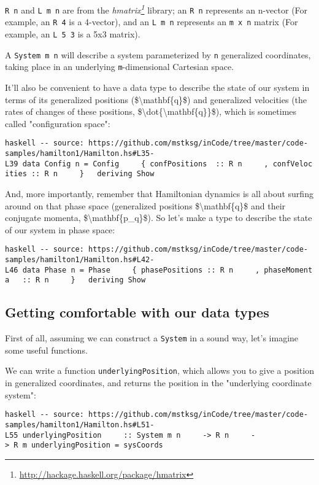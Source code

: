 \documentclass[]{article}
\renewcommand{\href}[2]{#2\footnote{\url{#1}}}
\begin{document}
\texttt{R\ n} and \texttt{L\ m\ n} are from the
\emph{\href{http://hackage.haskell.org/package/hmatrix}{hmatrix}} library; an
\texttt{R\ n} represents an n-vector (For example, an \texttt{R\ 4} is a
4-vector), and an \texttt{L\ m\ n} represents an \texttt{m\ x\ n} matrix (For
example, an \texttt{L\ 5\ 3} is a 5x3 matrix).

A \texttt{System\ m\ n} will describe a system parameterized by \texttt{n}
generalized coordinates, taking place in an underlying \texttt{m}-dimensional
Cartesian space.

It'll also be convenient to have a data type to describe the state of our system
in terms of its generalized positions (\$\textbackslash{}mathbf\{q\}\$) and
generalized velocities (the rates of changes of these positions,
\$\textbackslash{}dot\{\textbackslash{}mathbf\{q\}\}\$), which is sometimes
called "configuration space":

\texttt{haskell\ -\/-\ source:\ https://github.com/mstksg/inCode/tree/master/code-samples/hamilton1/Hamilton.hs\#L35-L39\ data\ Config\ n\ =\ Config\ \ \ \ \ \{\ confPositions\ \ ::\ R\ n\ \ \ \ \ ,\ confVelocities\ ::\ R\ n\ \ \ \ \ \}\ \ \ deriving\ Show}

And, more importantly, remember that Hamiltonian dynamics is all about surfing
around on that phase space (generalized positions
\$\textbackslash{}mathbf\{q\}\$ and their conjugate momenta,
\$\textbackslash{}mathbf\{p\_q\}\$). So let's make a type to describe the state
of our system in phase space:

\texttt{haskell\ -\/-\ source:\ https://github.com/mstksg/inCode/tree/master/code-samples/hamilton1/Hamilton.hs\#L42-L46\ data\ Phase\ n\ =\ Phase\ \ \ \ \ \{\ phasePositions\ ::\ R\ n\ \ \ \ \ ,\ phaseMomenta\ \ \ ::\ R\ n\ \ \ \ \ \}\ \ \ deriving\ Show}

\subsection{Getting comfortable with our data types}

First of all, assuming we can construct a \texttt{System} in a sound way, let's
imagine some useful functions.

We can write a function \texttt{underlyingPosition}, which allows you to give a
position in generalized coordinates, and returns the position in the "underlying
coordinate system":

\texttt{haskell\ -\/-\ source:\ https://github.com/mstksg/inCode/tree/master/code-samples/hamilton1/Hamilton.hs\#L51-L55\ underlyingPosition\ \ \ \ \ ::\ System\ m\ n\ \ \ \ \ -\textgreater{}\ R\ n\ \ \ \ \ -\textgreater{}\ R\ m\ underlyingPosition\ =\ sysCoords}
\end{document}
